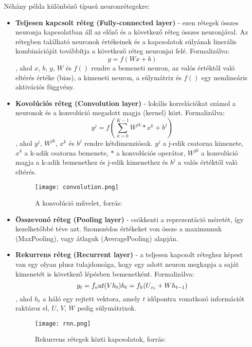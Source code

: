 Néhány példa különböző típusú neuronrétegekre:
\begin{itemize}
 \item \textbf{Teljesen kapcsolt réteg (Fully-connected layer)} - ezen rétegek összes neuronja kapcsolatban áll az előző és a következő réteg összes neuronjával. Az rétegben található neuronok értékeinek és a kapcsolatok súlyának linerális kombinációját továbbítja a következő réteg neuronjai felé. Formalizálva:
 \begin{equation}
	y = f(Wx + b)
\end{equation}
, ahol \(x\), \(b\), \(y\), \(W\) és \(f()\) rendre a bemeneti neuron, az valós értéktől való eltérés értéke (bias), a kimeneti neuron, a súlymátrix és \(f()\) egy nemlineáris aktivációs függvény.
 \item \textbf{Kovolúciós réteg (Convolution layer)} - lokális korrelációkat számol a neuronok és a konvolúció megadott magja (kernel) közt. Formalizálva:
 \begin{equation}
	y^j = f(\sum_{k=0}^{K-1}W^{jk}*x^k+b^j)
\end{equation}
, ahol \(y^j\),  \(W^{jk}\), \(x^k\) és \(b^j\) rendre kétdimenziósak. \(y^j\) a j-edik csatorna kimenete, \(x^k\) a k-adik csatorna bemenete, \(*\) a konvolúciós operátor,  \(W^{jk}\) a konvolúció magja a k-adik bemenethez és j-edik kimenethez és \(b^j\) a valós értéktől való eltérés.
\begin{figure}[H]
  \centering
  \texttt{[image: convolution.png]}
  \caption{A konvolúció művelet, forrás: \cite{deeplearningbook}}
\end{figure}
 \item \textbf{Összevonó réteg (Pooling layer)} - csökkenti a reprezentáció méretét, így kezelhetőbbé téve azt. Szomszédos értékeket von össze a maximumuk (MaxPooling), vagy átlaguk (AveragePooling) alapján.
 \item \textbf{Rekurrens réteg (Recurrent layer)} - a teljesen kapcsolt réteghez képest van egy olyan plusz tulajdonsága, hogy egy adott neuron megkapja a saját kimenetét is következő lépésben bemenetként. Formalizálva:
  \begin{equation}
	y_t = f_out(Vh_t) \\
	h_t = f_h(U_{x_t}+Wh_{t-1})
\end{equation}
, ahol \(h_t\) a háló egy rejtett vektora, amely \(t\) időpontra vonatkozó információt raktároz el, \(U\), \(V\), \(W\) pedig súlymátrixok. \cite{Choi2017}
\begin{figure}[H]
  \centering
  \texttt{[image: rnn.png]}
  \caption{Rekurrens rétegek közti kapcsolatok, forrás: \cite{deeplearningbook}}
\end{figure}
\end{itemize}

